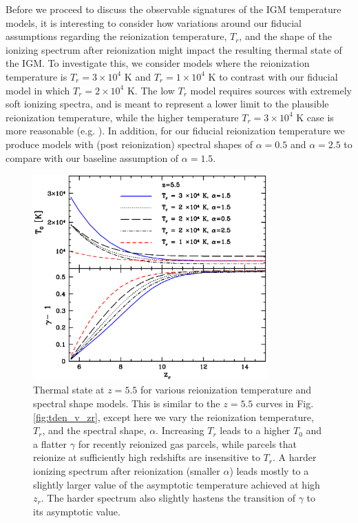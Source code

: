 Before we proceed to discuss the observable signatures of the IGM temperature models, it is interesting to consider
how variations around our fiducial assumptions regarding the reionization temperature, $T_r$, and the shape
of the ionizing spectrum after reionization might impact the resulting thermal state of the IGM. To investigate this,
we consider models where the reionization temperature is $T_r = 3 \times 10^4$ K and $T_r=1 \times 10^4$ K to
contrast with our fiducial model in which $T_r = 2 \times 10^4$ K. The low $T_r$ model requires sources with
extremely soft ionizing spectra, and is meant to represent a lower limit to the plausible reionization temperature,
while the higher temperature $T_r = 3 \times 10^4$ K case is more reasonable (e.g. \citealt{McQuinn:2012bq}).  
In addition, for our fiducial reionization temperature
we produce models with (post reionization) spectral shapes of $\alpha=0.5$ and $\alpha=2.5$ to compare with our baseline assumption of
$\alpha=1.5$.

\begin{figure}[t]
\bc
\includegraphics[width=9cm]{f8.eps}
\caption{Thermal state at $z=5.5$ for various reionization temperature and spectral shape models. This is similar to the
$z=5.5$ curves in Fig. \ref{fig:tden_v_zr}, except here we vary the reionization temperature, $T_r$, and the spectral shape,
$\alpha$. Increasing $T_r$ leads to a higher $T_0$ and a flatter $\gamma$ for recently reionized gas parcels, while parcels
that reionize at sufficiently high redshifts are insensitive to $T_r$. A harder ionizing spectrum after reionization 
(smaller $\alpha$) leads mostly to a slightly larger value of the asymptotic temperature achieved at high $z_r$.
The harder spectrum also slightly hastens the transition of $\gamma$ to its asymptotic value.}
\label{fig:temp_v_treion}
\ec
\end{figure}

